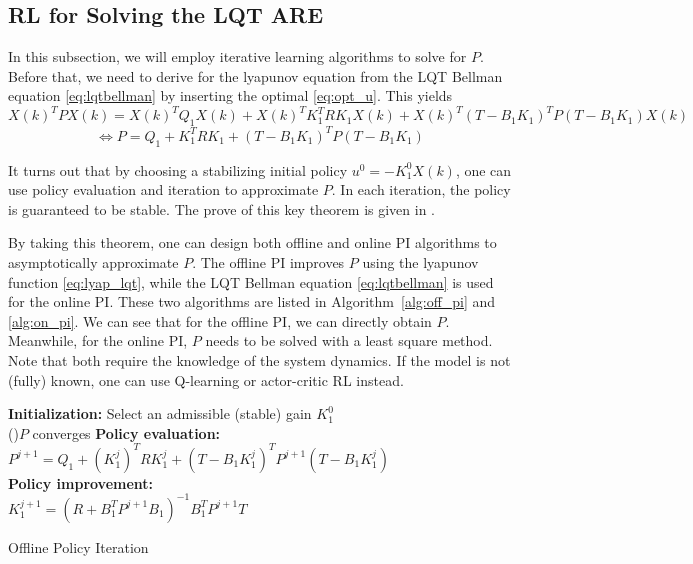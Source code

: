 \subsection{\acs{RL} for Solving the \acs {LQT} \acs{ARE}}
In this subsection, we will employ iterative learning algorithms to solve for $P$. Before that, we need to derive for the lyapunov equation from the \acs {LQT} Bellman equation \eqref{eq:lqtbellman} by inserting the optimal \eqref{eq:opt_u}. This yields
\begin{equation*}
X(k)^TPX(k) =  X(k)^TQ_1X(k) + X(k)^TK_1^TRK_1X(k) + X(k)^T(T - B_1K_1)^TP(T - B_1K_1)X(k)
\end{equation*}
\begin{equation}
\label{eq:lyap_lqt}
\Leftrightarrow  P =  Q_1 + K_1^TRK_1 + (T - B_1K_1)^TP(T - B_1K_1)
\end{equation}

It turns out that by choosing a stabilizing initial policy $u^0 = -K_1^0X(k)$, one can use policy evaluation and iteration to approximate $ P $. In each iteration, the policy is guaranteed to be stable. The prove of this key theorem is given in \cite{1099755}. 

By taking this theorem, one can design both offline and online \acs{PI} algorithms to asymptotically approximate $P$. The offline \acs{PI} improves $P$ using the lyapunov function \eqref{eq:lyap_lqt}, while the \acs {LQT} Bellman equation \eqref{eq:lqtbellman} is used for the online \acs{PI}. These two algorithms are listed in Algorithm~\ref{alg:off_pi} and \ref{alg:on_pi}. We can see that for the offline \acs{PI}, we can directly obtain $P$. Meanwhile, for the online \acs{PI}, $P$ needs to be solved with a least square method. Note that both require the knowledge of the system dynamics. If the model is not (fully) known, one can use Q-learning \cite{Kiumarsi20141167} or actor-critic \acs {RL} \cite{Modares20141780} instead. 

\begin{algorithm}[H]
	\textbf{Initialization:} Select an admissible (stable) gain $K^0_1$\\
	\Repeat(){$ P $ converges}{
		\textbf{Policy evaluation:} \\
		$P^{j+1} = Q_1 + (K_1^j)^TRK_1^j + (T-B_1K_1^j)^TP^{j+1}(T-B_1K_1^j)$\\
		
		\textbf{Policy improvement:} \\
		$ K_1^{j+1} = (R+B_1^TP^{j+1}B_1)^{-1} B_1^TP^{j+1}T $\\	
	}
	\label{alg:off_pi}
	\caption{Offline Policy Iteration}
\end{algorithm}

